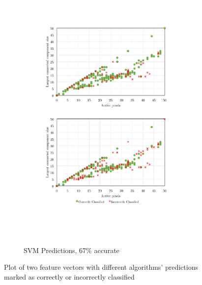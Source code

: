 \documentclass[../thesis/thesis.tex]{subfiles}
\begin{document}
\begin{figure}
\begin{subfigure}[b]{0.90\textwidth}
\centering
\includegraphics[width=\textwidth]{../diagrams/incorrect-correct-plot-smo2.pdf}
\caption{SVM Predictions, 67\% accurate}
\end{subfigure}
\caption{Plot of two feature vectors with different algorithms' predictions marked as correctly or incorrectly classified}
\label{fig:correctplots}
\end{figure}

\clearpage{}
\end{document}
